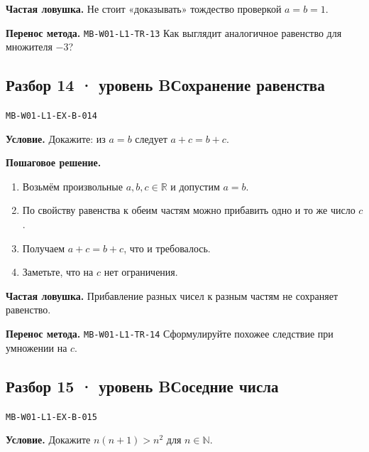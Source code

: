 \documentclass[11pt,a4paper,openany]{book}
\newcommand{\mtag}[1]{\textsf{\small\color{mbaccent}\bfseries #1}}
\newcommand{\muid}[1]{\texttt{\footnotesize #1}}
\begin{document}
\begin{learnbox}\textbf{Частая ловушка.} Не стоит «доказывать» тождество проверкой $a=b=1$.\par \textbf{Перенос метода.} \muid{MB-W01-L1-TR-13} Как выглядит аналогичное равенство для множителя $-3$?\end{learnbox}

\subsection*{\mtag{Разбор 14 · уровень B}\quad Сохранение равенства}\hypertarget{MB-W01-L1-EX-B-014}{}

\muid{MB-W01-L1-EX-B-014}\par

\begin{keybox}\textbf{Условие.} Докажите: из $a=b$ следует $a+c=b+c$.\end{keybox}

\textbf{Пошаговое решение.}\par
\begin{enumerate}[label=\arabic*),leftmargin=*,itemsep=3pt,topsep=4pt]
\item Возьмём произвольные $a,b,c\in\mathbb R$ и допустим $a=b$.
\item По свойству равенства к обеим частям можно прибавить одно и то же число $c$.
\item Получаем $a+c=b+c$, что и требовалось.
\item Заметьте, что на $c$ нет ограничения.
\end{enumerate}


\begin{learnbox}\textbf{Частая ловушка.} Прибавление разных чисел к разным частям не сохраняет равенство.\par \textbf{Перенос метода.} \muid{MB-W01-L1-TR-14} Сформулируйте похожее следствие при умножении на $c$.\end{learnbox}

\subsection*{\mtag{Разбор 15 · уровень B}\quad Соседние числа}\hypertarget{MB-W01-L1-EX-B-015}{}

\muid{MB-W01-L1-EX-B-015}\par

\begin{keybox}\textbf{Условие.} Докажите $n(n+1)>n^2$ для $n\in\mathbb N$.\end{keybox}
\end{document}

